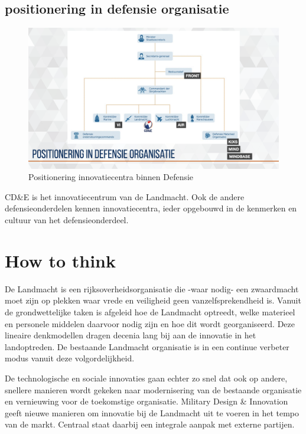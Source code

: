 \documentclass[
]{book}
\begin{document}
\hypertarget{positionering-in-defensie-organisatie}{%
\section{positionering in defensie organisatie}\label{positionering-in-defensie-organisatie}}

\begin{figure}

{\centering \includegraphics[width=0.7\linewidth]{data/keynote-slides/20200430-CDE-Designprocess/20200430-CDE-Designprocess.009-1} 

}

\caption{Positionering innovatiecentra binnen Defensie }\label{fig:unnamed-chunk-6}
\end{figure}

CD\&E is het innovatiecentrum van de Landmacht. Ook de andere defensieonderdelen kennen innovatiecentra, ieder opgebouwd in de kenmerken en cultuur van het defensieonderdeel.

\hypertarget{how-to-think}{%
\chapter{\texorpdfstring{How to think }{How to think }}\label{how-to-think}}

De Landmacht is een rijksoverheidsorganisatie die -waar nodig- een zwaardmacht moet zijn op plekken waar vrede en veiligheid geen vanzelfsprekendheid is. Vanuit de grondwettelijke taken is afgeleid hoe de Landmacht optreedt, welke materieel en personele middelen daarvoor nodig zijn en hoe dit wordt georganiseerd. Deze lineaire denkmodellen dragen decenia lang bij aan de innovatie in het landoptreden. De bestaande Landmacht organisatie is in een continue verbeter modus vanuit deze volgordelijkheid.

De technologische en sociale innovaties gaan echter zo snel dat ook op andere, snellere manieren wordt gekeken naar modernisering van de bestaande organisatie en vernieuwing voor de toekomstige organisatie. Military Design \& Innovation geeft nieuwe manieren om innovatie bij de Landmacht uit te voeren in het tempo van de markt. Centraal staat daarbij een integrale aanpak met externe partijen.
\end{document}

